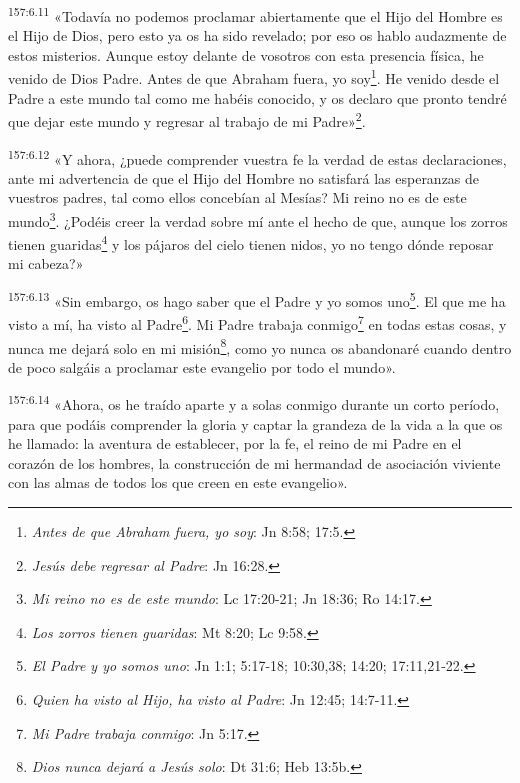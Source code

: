 \par 
\textsuperscript{157:6.11} «Todavía no podemos proclamar abiertamente que el Hijo del Hombre es el Hijo de Dios, pero esto ya os ha sido revelado; por eso os hablo audazmente de estos misterios. Aunque estoy delante de vosotros con esta presencia física, he venido de Dios Padre. Antes de que Abraham fuera, yo soy\footnote{\textit{Antes de que Abraham fuera, yo soy}: Jn 8:58; 17:5.}. He venido desde el Padre a este mundo tal como me habéis conocido, y os declaro que pronto tendré que dejar este mundo y regresar al trabajo de mi Padre»\footnote{\textit{Jesús debe regresar al Padre}: Jn 16:28.}.

\par 
\textsuperscript{157:6.12} «Y ahora, ¿puede comprender vuestra fe la verdad de estas declaraciones, ante mi advertencia de que el Hijo del Hombre no satisfará las esperanzas de vuestros padres, tal como ellos concebían al Mesías? Mi reino no es de este mundo\footnote{\textit{Mi reino no es de este mundo}: Lc 17:20-21; Jn 18:36; Ro 14:17.}. ¿Podéis creer la verdad sobre mí ante el hecho de que, aunque los zorros tienen guaridas\footnote{\textit{Los zorros tienen guaridas}: Mt 8:20; Lc 9:58.} y los pájaros del cielo tienen nidos, yo no tengo dónde reposar mi cabeza?»

\par 
\textsuperscript{157:6.13} «Sin embargo, os hago saber que el Padre y yo somos uno\footnote{\textit{El Padre y yo somos uno}: Jn 1:1; 5:17-18; 10:30,38; 14:20; 17:11,21-22.}. El que me ha visto a mí, ha visto al Padre\footnote{\textit{Quien ha visto al Hijo, ha visto al Padre}: Jn 12:45; 14:7-11.}. Mi Padre trabaja conmigo\footnote{\textit{Mi Padre trabaja conmigo}: Jn 5:17.} en todas estas cosas, y nunca me dejará solo en mi misión\footnote{\textit{Dios nunca dejará a Jesús solo}: Dt 31:6; Heb 13:5b.}, como yo nunca os abandonaré cuando dentro de poco salgáis a proclamar este evangelio por todo el mundo».

\par 
\textsuperscript{157:6.14} «Ahora, os he traído aparte y a solas conmigo durante un corto período, para que podáis comprender la gloria y captar la grandeza de la vida a la que os he llamado: la aventura de establecer, por la fe, el reino de mi Padre en el corazón de los hombres, la construcción de mi hermandad de asociación viviente con las almas de todos los que creen en este evangelio».

